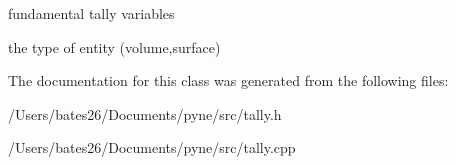 fundamental tally variables 

the type of entity (volume,surface) 

The documentation for this class was generated from the following files\+:\begin{DoxyCompactItemize}
\item 
/\+Users/bates26/\+Documents/pyne/src/tally.\+h\item 
/\+Users/bates26/\+Documents/pyne/src/tally.\+cpp\end{DoxyCompactItemize}
